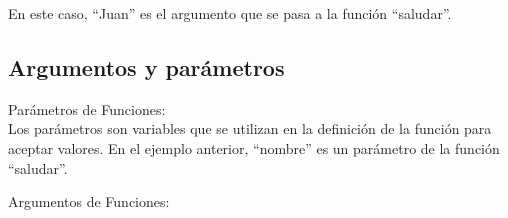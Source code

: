 \begin{figure}[h]
    \centering
  \end{figure}

En este caso, ``Juan'' es el argumento que se pasa a la función ``saludar''.

\subsection{Argumentos y parámetros}
Parámetros de Funciones:\\

Los parámetros son variables que se utilizan en la definición de la función para aceptar valores. En el ejemplo anterior, ``nombre'' es un parámetro de la función ``saludar''.
\begin{figure}[h]
    \centering
  \end{figure}

Argumentos de Funciones:\\

